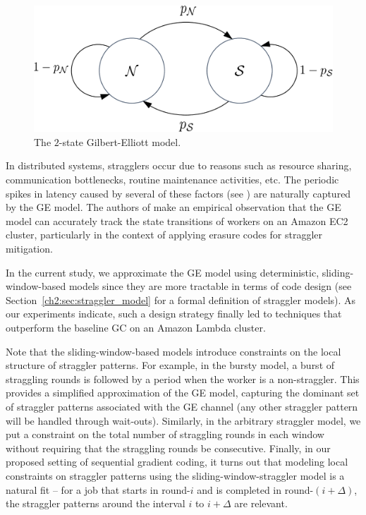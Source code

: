 \begin{figure}[!h]
	\centering
	\includegraphics[scale=0.25]{figs/ch2/fig_GE_model_v2}
	\caption{The $2$-state Gilbert-Elliott model.}
	\label{ch2:fig:GE_model}
\end{figure}

In distributed systems, stragglers occur due to reasons such as resource sharing, communication bottlenecks, routine maintenance activities, etc. The periodic spikes in latency caused by several of these factors (see \cite{tailatscale,Bolot93}) are naturally captured by the GE model. The authors of \cite{timelycodedcomputing} make an empirical observation that the GE model can accurately track the state transitions of workers on an Amazon EC2 cluster, particularly in the context of applying erasure codes for straggler mitigation. 

In the current study, we approximate the GE model using deterministic, sliding-window-based models since they are more tractable in terms of code design (see Section~\ref{ch2:sec:straggler_model} for a formal definition of straggler models). As our experiments indicate, such a design strategy finally led to techniques that outperform the baseline GC on an Amazon Lambda cluster.

Note that the sliding-window-based models introduce constraints on the local structure of straggler patterns. For example, in the bursty model, a burst of straggling rounds is followed by a period when the worker is a non-straggler. This provides a simplified approximation of the GE model, capturing the dominant set of straggler patterns associated with the GE channel (any other straggler pattern will be handled through wait-outs).  Similarly, in the arbitrary straggler model, we put a constraint on the total number of straggling rounds in each window without requiring that the straggling rounds be consecutive. Finally, in our proposed setting of sequential gradient coding, it turns out that modeling local constraints on straggler patterns using the sliding-window-straggler model is a natural fit -- for a job that starts in round-$i$ and is completed in round-$(i+\Delta)$, the straggler patterns around the interval $i$ to $i+\Delta$ are relevant.  


